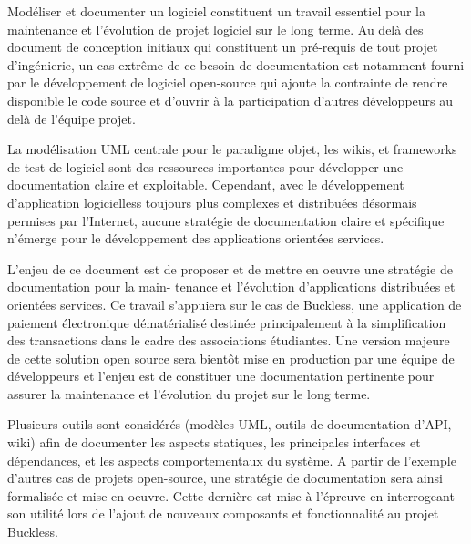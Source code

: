 Modéliser et documenter un logiciel constituent un travail essentiel pour la maintenance et l'évolution de projet
logiciel sur le long terme. Au delà des document de conception initiaux qui constituent un pré-requis de tout projet
d'ingénierie, un cas extrême de ce besoin de documentation est notamment fourni par le développement de logiciel
open-source qui ajoute la contrainte de rendre disponible le code source et d'ouvrir à la participation d'autres
développeurs au delà de l'équipe projet.

La modélisation UML centrale pour le paradigme objet, les wikis, et frameworks
de test de logiciel sont des ressources importantes pour développer une documentation claire et exploitable. Cependant,
avec le développement d'application logicielless toujours plus complexes et distribuées désormais permises par
l'Internet, aucune stratégie de documentation claire et spécifique n'émerge pour le développement des applications
orientées services.

L'enjeu de ce document est de proposer et de mettre en oeuvre une stratégie de documentation pour la main-
tenance et l'évolution d'applications distribuées et orientées services. Ce travail s'appuiera sur le cas de Buckless,
une application de paiement électronique dématérialisé destinée principalement à la simplification des transactions
dans le cadre des associations étudiantes. Une version majeure de cette solution open source sera bientôt mise en
production par une équipe de développeurs et l'enjeu est de constituer une documentation pertinente pour assurer
la maintenance et l'évolution du projet sur le long terme.

Plusieurs outils sont considérés (modèles UML, outils de documentation d'API, wiki) afin de documenter les
aspects statiques, les principales interfaces et dépendances, et les aspects comportementaux du système. A partir
de l'exemple d'autres cas de projets open-source, une stratégie de documentation sera ainsi formalisée et mise en
oeuvre. Cette dernière est mise à l'épreuve en interrogeant son utilité lors de l'ajout de nouveaux composants et
fonctionnalité au projet Buckless.